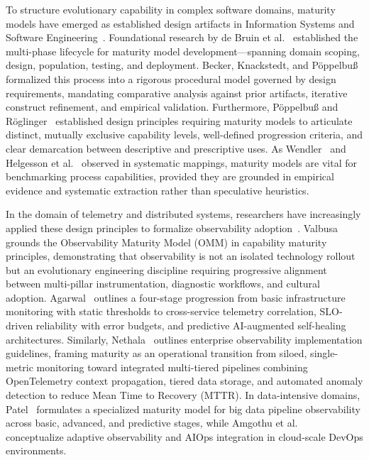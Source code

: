 \documentclass[sigconf, anonymous, balance=false]{acmart}
\begin{document}
To structure evolutionary capability in complex software domains, maturity models have emerged as established design artifacts in Information Systems and Software Engineering~\cite{wendler_2012}. Foundational research by de Bruin et al.~\cite{debruin_2005} established the multi-phase lifecycle for maturity model development—spanning domain scoping, design, population, testing, and deployment. Becker, Knackstedt, and Pöppelbuß~\cite{becker_2009} formalized this process into a rigorous procedural model governed by design requirements, mandating comparative analysis against prior artifacts, iterative construct refinement, and empirical validation. Furthermore, Pöppelbuß and Röglinger~\cite{poppelbuss_2011} established design principles requiring maturity models to articulate distinct, mutually exclusive capability levels, well-defined progression criteria, and clear demarcation between descriptive and prescriptive uses. As Wendler~\cite{wendler_2012} and Helgesson et al.~\cite{helgesson_2012} observed in systematic mappings, maturity models are vital for benchmarking process capabilities, provided they are grounded in empirical evidence and systematic extraction rather than speculative heuristics.

In the domain of telemetry and distributed systems, researchers have increasingly applied these design principles to formalize observability adoption~\cite{valbusa_2025, agarwal_2022, nethala_2025}. Valbusa~\cite{valbusa_2025} grounds the Observability Maturity Model (OMM) in capability maturity principles, demonstrating that observability is not an isolated technology rollout but an evolutionary engineering discipline requiring progressive alignment between multi-pillar instrumentation, diagnostic workflows, and cultural adoption. Agarwal~\cite{agarwal_2022} outlines a four-stage progression from basic infrastructure monitoring with static thresholds to cross-service telemetry correlation, SLO-driven reliability with error budgets, and predictive AI-augmented self-healing architectures. Similarly, Nethala~\cite{nethala_2025} outlines enterprise observability implementation guidelines, framing maturity as an operational transition from siloed, single-metric monitoring toward integrated multi-tiered pipelines combining OpenTelemetry context propagation, tiered data storage, and automated anomaly detection to reduce Mean Time to Recovery (MTTR). In data-intensive domains, Patel~\cite{patel_2025} formulates a specialized maturity model for big data pipeline observability across basic, advanced, and predictive stages, while Amgothu et al.~\cite{amgothu_2025} conceptualize adaptive observability and AIOps integration in cloud-scale DevOps environments.
\end{document}
